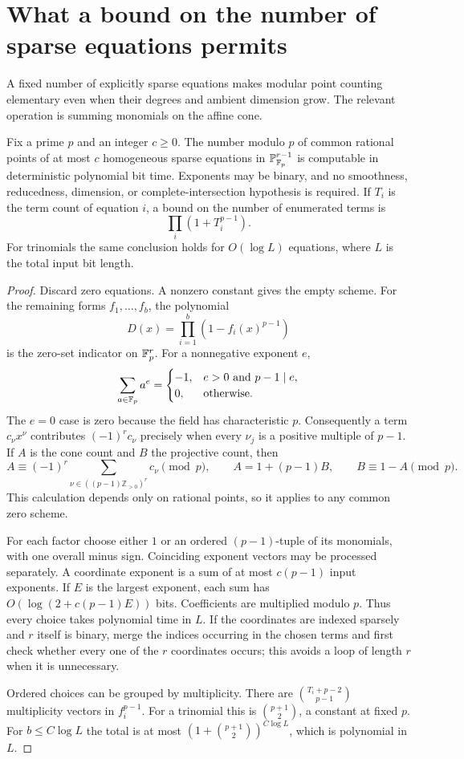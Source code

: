 \section{What a bound on the number of sparse equations permits}
\label{sp:sec:bounded}
A fixed number of explicitly sparse equations makes modular point
counting elementary even when their degrees and ambient dimension grow.
The relevant operation is summing monomials on the affine cone.

\begin{theorem}
\label{sp:thm:bounded}
Fix a prime $p$ and an integer $c\geq0$. The number modulo $p$ of common
rational points of at most $c$ homogeneous sparse equations in
$\mathbb P^{r-1}_{\mathbb F_p}$ is computable in deterministic polynomial bit time.
Exponents may be binary, and no smoothness, reducedness, dimension, or
complete-intersection hypothesis is required. If $T_i$ is the term count
of equation $i$, a bound on the number of enumerated terms is
\[
 \prod_i(1+T_i^{p-1}).
\]
For trinomials the same conclusion holds for $O(\log L)$ equations,
where $L$ is the total input bit length.
\end{theorem}

\begin{proof}
Discard zero equations. A nonzero constant gives the empty scheme.
For the remaining forms $f_1,\ldots,f_b$, the polynomial
\[
 D(x)=\prod_{i=1}^b(1-f_i(x)^{p-1})
\]
is the zero-set indicator on $\mathbb F_p^r$. For a nonnegative exponent $e$,
\[
 \sum_{a\in\mathbb F_p}a^e=
 \begin{cases}-1,&e>0\text{ and }p-1\mid e,\\0,&\text{otherwise}.
 \end{cases}
\]
The $e=0$ case is zero because the field has characteristic $p$.
Consequently a term $c_\nu x^\nu$ contributes $(-1)^r c_\nu$ precisely
when every $\nu_j$ is a positive multiple of $p-1$. If $A$ is the cone
count and $B$ the projective count, then
\[
 A\equiv(-1)^r\!
 \sum_{\nu\in((p-1)\mathbb Z_{>0})^r}c_\nu\pmod p,
 \qquad A=1+(p-1)B,
 \qquad B\equiv1-A\pmod p.
\]
This calculation depends only on rational points, so it applies to any
common zero scheme.

For each factor choose either $1$ or an ordered $(p-1)$-tuple of its
monomials, with one overall minus sign. Coinciding exponent vectors may
be processed separately. A coordinate exponent is a sum of at most
$c(p-1)$ input exponents. If $E$ is the largest exponent, each sum has
$O(\log(2+c(p-1)E))$ bits. Coefficients are multiplied modulo $p$.
Thus every choice takes polynomial time in $L$. If the coordinates are
indexed sparsely and $r$ itself is binary, merge the indices occurring in
the chosen terms and first check whether every one of the $r$ coordinates
occurs; this avoids a loop of length $r$ when it is unnecessary.

Ordered choices can be grouped by multiplicity. There are
$\binom{T_i+p-2}{p-1}$ multiplicity vectors in $f_i^{p-1}$.
For a trinomial this is $\binom{p+1}{2}$, a constant at fixed $p$.
For $b\leq C\log L$ the total is at most
$(1+\binom{p+1}{2})^{C\log L}$, which is polynomial in $L$.
\end{proof}

